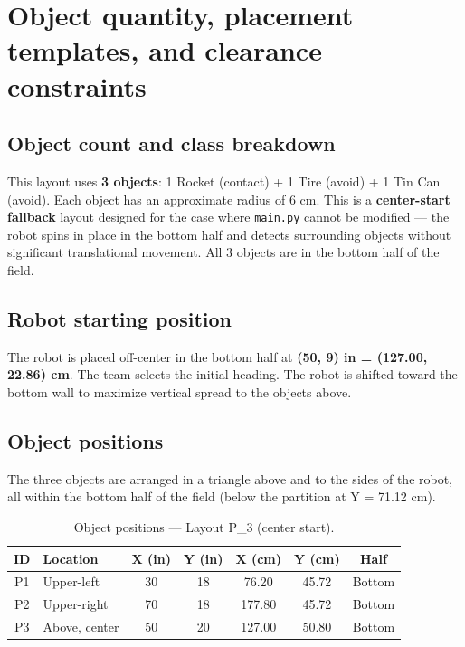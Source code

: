 \documentclass[a4]{article}
\begin{document}
\section*{Object quantity, placement templates, and clearance constraints}
\subsection*{Object count and class breakdown}
This layout uses \textbf{3 objects}: 1 Rocket (contact) + 1 Tire (avoid) + 1 Tin Can (avoid). Each object has an approximate radius of 6 cm. This is a \textbf{center-start fallback} layout designed for the case where \texttt{main.py} cannot be modified --- the robot spins in place in the bottom half and detects surrounding objects without significant translational movement. All 3 objects are in the bottom half of the field.

\subsection*{Robot starting position}

The robot is placed off-center in the bottom half at \textbf{(50, 9) in = (127.00, 22.86) cm}. The team selects the initial heading. The robot is shifted toward the bottom wall to maximize vertical spread to the objects above.

\subsection*{Object positions}

The three objects are arranged in a triangle above and to the sides of the robot, all within the bottom half of the field (below the partition at Y = 71.12 cm).

\begin{table}[H]
\centering
\begin{tabular}{clccccc}
\toprule
\textbf{ID} & \textbf{Location} & \textbf{X (in)} & \textbf{Y (in)} & \textbf{X (cm)} & \textbf{Y (cm)} & \textbf{Half} \\
\midrule
P1 & Upper-left & 30 & 18 & 76.20 & 45.72 & Bottom \\
P2 & Upper-right & 70 & 18 & 177.80 & 45.72 & Bottom \\
P3 & Above, center & 50 & 20 & 127.00 & 50.80 & Bottom \\
\bottomrule
\end{tabular}
\caption{Object positions --- Layout P\_3 (center start).}
\end{table}
\end{document}
